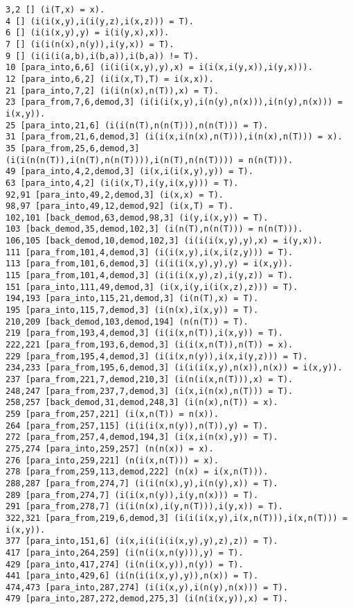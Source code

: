{\begin{verbatim}
3,2 [] (i(T,x) = x).
4 [] (i(i(x,y),i(i(y,z),i(x,z))) = T).
6 [] (i(i(x,y),y) = i(i(y,x),x)).
7 [] (i(i(n(x),n(y)),i(y,x)) = T).
9 [] (i(i(i(a,b),i(b,a)),i(b,a)) != T).
10 [para_into,6,6] (i(i(i(x,y),y),x) = i(i(x,i(y,x)),i(y,x))).
12 [para_into,6,2] (i(i(x,T),T) = i(x,x)).
21 [para_into,7,2] (i(i(n(x),n(T)),x) = T).
23 [para_from,7,6,demod,3] (i(i(i(x,y),i(n(y),n(x))),i(n(y),n(x))) = i(x,y)).
25 [para_into,21,6] (i(i(n(T),n(n(T))),n(n(T))) = T).
31 [para_from,21,6,demod,3] (i(i(x,i(n(x),n(T))),i(n(x),n(T))) = x).
35 [para_from,25,6,demod,3] (i(i(n(n(T)),i(n(T),n(n(T)))),i(n(T),n(n(T)))) = n(n(T))).
49 [para_into,4,2,demod,3] (i(x,i(i(x,y),y)) = T).
63 [para_into,4,2] (i(i(x,T),i(y,i(x,y))) = T).
92,91 [para_into,49,2,demod,3] (i(x,x) = T).
98,97 [para_into,49,12,demod,92] (i(x,T) = T).
102,101 [back_demod,63,demod,98,3] (i(y,i(x,y)) = T).
103 [back_demod,35,demod,102,3] (i(n(T),n(n(T))) = n(n(T))).
106,105 [back_demod,10,demod,102,3] (i(i(i(x,y),y),x) = i(y,x)).
111 [para_from,101,4,demod,3] (i(i(x,y),i(x,i(z,y))) = T).
113 [para_from,101,6,demod,3] (i(i(i(x,y),y),y) = i(x,y)).
115 [para_from,101,4,demod,3] (i(i(i(x,y),z),i(y,z)) = T).
151 [para_into,111,49,demod,3] (i(x,i(y,i(i(x,z),z))) = T).
194,193 [para_into,115,21,demod,3] (i(n(T),x) = T).
195 [para_into,115,7,demod,3] (i(n(x),i(x,y)) = T).
210,209 [back_demod,103,demod,194] (n(n(T)) = T).
219 [para_from,193,4,demod,3] (i(i(x,n(T)),i(x,y)) = T).
222,221 [para_from,193,6,demod,3] (i(i(x,n(T)),n(T)) = x).
229 [para_from,195,4,demod,3] (i(i(x,n(y)),i(x,i(y,z))) = T).
234,233 [para_from,195,6,demod,3] (i(i(i(x,y),n(x)),n(x)) = i(x,y)).
237 [para_from,221,7,demod,210,3] (i(n(i(x,n(T))),x) = T).
248,247 [para_from,237,7,demod,3] (i(x,i(n(x),n(T))) = T).
258,257 [back_demod,31,demod,248,3] (i(n(x),n(T)) = x).
259 [para_from,257,221] (i(x,n(T)) = n(x)).
264 [para_from,257,115] (i(i(i(x,n(y)),n(T)),y) = T).
272 [para_from,257,4,demod,194,3] (i(x,i(n(x),y)) = T).
275,274 [para_into,259,257] (n(n(x)) = x).
276 [para_into,259,221] (n(i(x,n(T))) = x).
278 [para_from,259,113,demod,222] (n(x) = i(x,n(T))).
288,287 [para_from,274,7] (i(i(n(x),y),i(n(y),x)) = T).
289 [para_from,274,7] (i(i(x,n(y)),i(y,n(x))) = T).
291 [para_from,278,7] (i(i(n(x),i(y,n(T))),i(y,x)) = T).
322,321 [para_from,219,6,demod,3] (i(i(i(x,y),i(x,n(T))),i(x,n(T))) = i(x,y)).
377 [para_into,151,6] (i(x,i(i(i(i(x,y),y),z),z)) = T).
417 [para_into,264,259] (i(n(i(x,n(y))),y) = T).
429 [para_into,417,274] (i(n(i(x,y)),n(y)) = T).
441 [para_into,429,6] (i(n(i(i(x,y),y)),n(x)) = T).
474,473 [para_into,287,274] (i(i(x,y),i(n(y),n(x))) = T).
479 [para_into,287,272,demod,275,3] (i(n(i(x,y)),x) = T).

\end{verbatim}}
